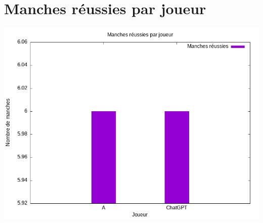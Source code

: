 \documentclass{article}
\begin{document}
\section*{Manches réussies par joueur}
\includegraphics[width=\textwidth]{../Graphiques/manches_reussies_par_joueur.png}
\end{document}
